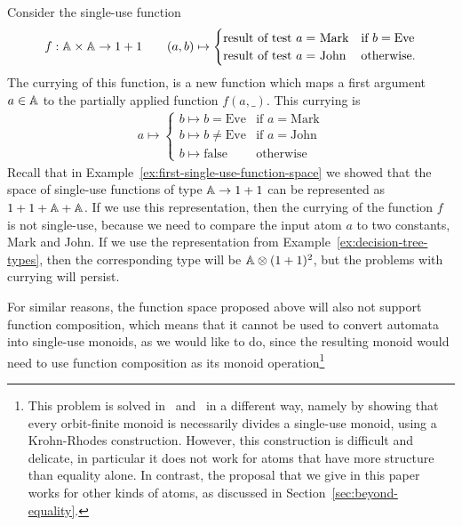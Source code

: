 \begin{example}\label{ex:currying-not-single-use}
    Consider  the single-use function
    \begin{align*}
    f : \mathbb A \times \mathbb A \to 1 + 1 \qquad (a,b)  
    \mapsto \begin{cases}
        \text{result of test $a = $ Mark} & \text{if } b = \text{Eve} \\
        \text{result of test $a = $ John} & \text{otherwise}.
        \end{cases}
    \end{align*}
The currying of this function, is a new function which  maps a first argument $a \in \mathbb A$ to the partially applied function $f(a,\_)$. This currying is
\begin{align*}
    a \mapsto \begin{cases}
        b \mapsto b = \text{Eve} & \text{if } a = \text{Mark} \\
        b \mapsto b \neq \text{Eve} & \text{if } a = \text{John} \\
        b \mapsto \text{false} & \text{otherwise}
        \end{cases}
\end{align*}
Recall that in Example~\ref{ex:first-single-use-function-space} we showed that the space of single-use functions of type $\mathbb A \to 1 + 1$ can be represented as $1 + 1 + \mathbb A + \mathbb A$. If we use this representation,  then the currying of the function $f$  is not single-use, because we need to compare the input atom $a$ to two constants, Mark and John. If we use the representation from Example~\ref{ex:decision-tree-types}, then the corresponding type will be $\mathbb A \otimes (1 + 1)^2$, but the problems with currying will persist. \exampleend
\end{example}

For similar reasons, 
the function space proposed above will also not support function composition, which means that it cannot be used to convert automata into single-use monoids, as we would like to do, since the resulting monoid would need to use function composition as its monoid operation\footnote{This problem is solved in~\cite{bojanczykstefanski2020} and~\cite{stefanski-phd} in a different way, namely by showing that every orbit-finite monoid is necessarily divides a single-use monoid, using a  Krohn-Rhodes construction. However, this construction is difficult and delicate, in particular it does not work for atoms that have more structure than equality alone. In contrast, the proposal that we give in this paper works for other kinds of atoms, as discussed in Section~\ref{sec:beyond-equality}. }

